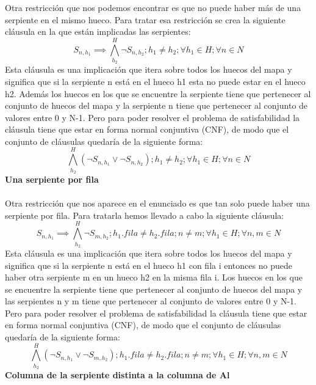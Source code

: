 \documentclass[11pt,spanish]{article}
\begin{document}
			Otra restricción que nos podemos encontrar es que no puede haber más de una serpiente en el mismo hueco. Para tratar esa restricción se crea la siguiente cláusula en la que están implicadas las serpientes:
			\begin{equation*}
				S_{n,h_1} \implies \bigwedge\limits_{h_2}^H \neg S_{n,h_2}; h_1 \neq h_2; \forall h_1\in H; \forall n \in N
			\end{equation*}
			Esta cláusula es una implicación que itera sobre todos los huecos del mapa y significa que si la serpiente n está en el hueco h1 esta no puede estar en el hueco h2. Además los huecos en los que se encuentre la serpiente tiene que pertenecer al conjunto de huecos del mapa y la serpiente n tiene que pertenecer al conjunto de valores entre 0 y N-1. Pero para poder resolver el problema de satisfabilidad la cláusula tiene que estar en forma normal conjuntiva (CNF), de modo que el conjunto de cláusulas quedaría de la siguiente forma:
			\begin{equation*}
				\bigwedge\limits_{h_2}^H (\neg S_{n,h_1} \lor \neg S_{n,h_2}); h_1 \neq h_2; \forall h_1\in H; \forall n \in N
			\end{equation*}
			\textbf{Una serpiente por fila}\\\\
			Otra restricción que nos aparece en el enunciado es que tan solo puede haber una serpiente por fila. Para tratarla hemos llevado a cabo la siguiente cláusula:
			\begin{equation*}
				S_{n,h_1} \implies \bigwedge\limits_{h_2}^H \neg S_{m,h_2}; h_1.fila \neq h_2.fila; n \neq m; \forall h_1 \in H; \forall n,m \in N
			\end{equation*}
			Esta cláusula es una implicación que itera sobre todos los huecos del mapa y significa que si la serpiente n está en el hueco h1 con fila i entonces no puede haber otra serpiente m en un hueco h2 en la misma fila i. Los huecos en los que se encuentre la serpiente tiene que pertenecer al conjunto de huecos del mapa y las serpientes n y m tiene que pertenecer al conjunto de valores entre 0 y N-1. Pero para poder resolver el problema de satisfabilidad la cláusula tiene que estar en forma normal conjuntiva (CNF), de modo que el conjunto de cláusulas quedaría de la siguiente forma:
			\begin{equation*}
				\bigwedge\limits_{h_2}^H (\neg S_{n,h_1} \lor \neg S_{m,h_2}); h_1.fila \neq h_2.fila; n \neq m; \forall h_1 \in H; \forall n,m \in N
			\end{equation*}
			\textbf{Columna de la serpiente distinta a la columna de Al}\\\\
\end{document}

